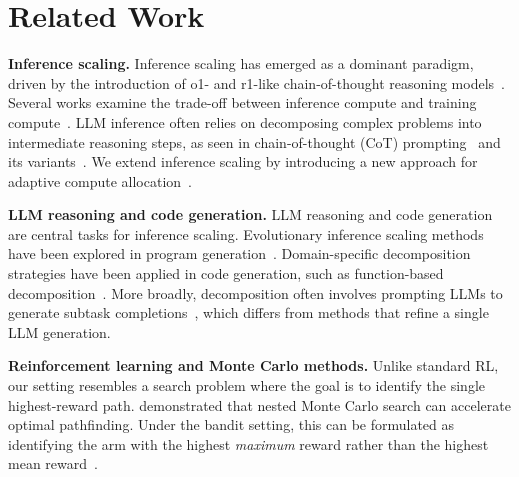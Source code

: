 \section{Related Work}
\vspace{-0.2cm}
\textbf{Inference scaling.}  
Inference scaling has emerged as a dominant paradigm, driven by the introduction of o1- and r1-like chain-of-thought reasoning models~\citep{snell2024scaling, brown2024large, manvi2024adaptive, leea2025evolving}. Several works examine the trade-off between inference compute and training compute~\citep{guan2025rstarmathsmallllmsmaster, chen2024think}. LLM inference often relies on decomposing complex problems into intermediate reasoning steps, as seen in chain-of-thought (CoT) prompting~\citep{wei2022chain, sprague2024cotcot, wang2024chainofthoughtr} and its variants~\citep{kojima2022large, zhouleast, wangself, li2023making}. We extend inference scaling by introducing a new approach for adaptive compute allocation~\citep{manvi2024adaptive}.


\textbf{LLM reasoning and code generation.}  
LLM reasoning and code generation are central tasks for inference scaling. Evolutionary inference scaling methods have been explored in program generation~\citep{liventsev2023fully, chen2023evoprompting, romera2024mathematical, lehman2023evolution, hemberg2024evolving}. Domain-specific decomposition strategies have been applied in code generation, such as function-based decomposition~\citep{chen2024divide, zenkner2024abstractbeam, levin2025effective}. More broadly, decomposition often involves prompting LLMs to generate subtask completions~\citep{hernandez2recursive, khot2022decomposed, dua2022successive}, which differs from methods that refine a single LLM generation.

\textbf{Reinforcement learning and Monte Carlo methods.}  
Unlike standard RL, our setting resembles a search problem where the goal is to identify the single highest-reward path. \citet{cazenave2009nested} demonstrated that nested Monte Carlo search can accelerate optimal pathfinding. Under the bandit setting, this can be formulated as identifying the arm with the highest \emph{maximum} reward rather than the highest mean reward~\citep{cicirello2005max, carpentier2014extreme}.
